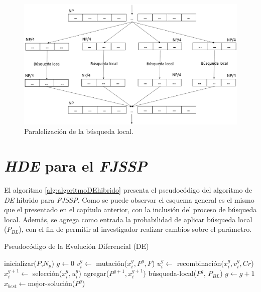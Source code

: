 \begin{figure}[H]
    \centering
    \includegraphics[width=\textwidth]{images/Paralelizacion-LS.eps}
    \caption{Paralelización de la búsqueda local.}
    \label{fig:ParalelizacionLS}
\end{figure}

\section{\textit{HDE} para el \textit{FJSSP}}
El algoritmo \ref{alg:algoritmoDEhibrido} presenta el pseudocódigo del algoritmo de \textit{DE} híbrido para \textit{FJSSP}. Como se puede observar el esquema general es el mismo que el presentado en el capítulo anterior, con la inclusión del proceso de búsqueda local. Además, se agrega como entrada la probabilidad de aplicar búsqueda local ($P_{BL}$), con el fin de permitir al investigador realizar cambios sobre el parámetro.

\begin{algorithm} [H]
    \caption{Pseudocódigo de la Evolución Diferencial (DE)} \label{alg:algoritmoDEhibrido}
    \begin{algorithmic} [1]
        \State inicializar($P$,$N_p$) 
        \State $g \leftarrow 0$
                \State $v_{i}^g \leftarrow $ mutación($x_{i}^g, P^g, F$) 
                \State $u_{i}^g \leftarrow $ recombinación($x_{i}^g, v_{i}^g, Cr$)
                \State $x_{i}^{g+1} \leftarrow $ selección($x_{i}^g, u_{i}^g$)
                \State agregar($P^{g+1}, x_{i}^{g+1}$) 
            \EndFor
            \State búsqueda-local($P^g$, $P_{BL}$)
            \State $g \leftarrow g+1$ 
        \EndWhile
        \State$x_{best} \leftarrow $mejor-solución($P^{g}$)

    \end{algorithmic}
\end{algorithm}